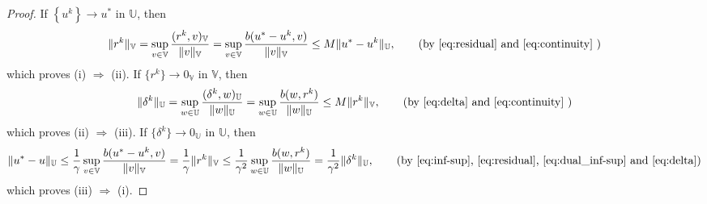 \documentclass[10pt,a4paper]{amsart}
\begin{document}
\begin{proof}
    If $\left\{u^k\right\}\to u^*$ in $\mathbb U$, then 
    \begin{align}
    \|r^k\|_\mathbb V=\sup_{v\in\mathbb V}{(r^k,v)_\mathbb V\over\|v\|_\mathbb V}
    =\sup_{v\in\mathbb V}{b(u^*-u^k,v)\over\|v\|_\mathbb V}\leq M \|u^*-u^k\|_\mathbb U,\tag{by~\eqref{eq:residual}~and~\eqref{eq:continuity} }
    \end{align}
    which proves (i) $\Rightarrow$ (ii).
%
    If $\{r^k\}\to 0_\mathbb V$ in $\mathbb V$, then
    \begin{align}
    \|\delta^k\|_\mathbb U=\sup_{w\in\mathbb U}{(\delta^k,w)_\mathbb U\over\|w\|_\mathbb U}
    =\sup_{w \in\mathbb U}{b(w,r^k)\over\|w\|_\mathbb U}\leq M \|r^k\|_\mathbb V,
    \tag{by~\eqref{eq:delta}~and~\eqref{eq:continuity} }
    \end{align}
    which proves (ii) $\Rightarrow$ (iii).
If $\{\delta^k\}\to 0_\mathbb U$ in $\mathbb U$, then
    \begin{align}
    \|u^*-u\|_\mathbb U\leq {1\over\gamma}\sup_{v\in\mathbb V}{b(u^*-u^k,v)\over\|v\|_\mathbb V}
    = {1\over\gamma}\|r^k\|_\mathbb V\leq {1\over\gamma^2}\sup_{w\in\mathbb U}{b(w,r^k)\over\|w\|_\mathbb U}={1\over\gamma^2}\|\delta^k\|_\mathbb U, 
    \tag{by~\eqref{eq:inf-sup}, \eqref{eq:residual}, \eqref{eq:dual_inf-sup}~and~\eqref{eq:delta}}
    \end{align}
    which proves (iii) $\Rightarrow$ (i).
\end{proof}
\end{document}
